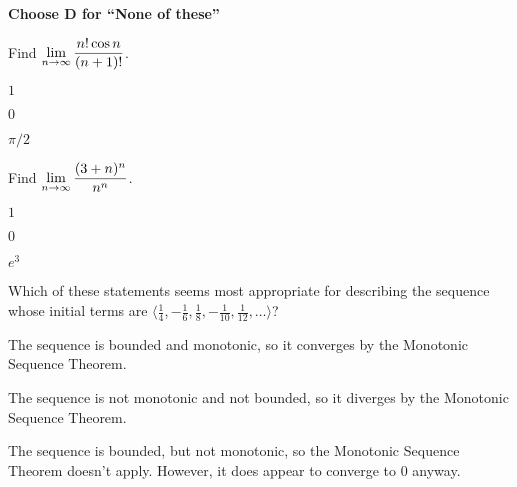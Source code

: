 \documentclass[12pt]{exam}
\newcommand{\ds}{\ensuremath{\displaystyle}}
\newcommand{\<}{\langle}
\renewcommand{\>}{\rangle}
\begin{document}
\begin{center}
\end{center}
\vspace{0.1in}

\vspace{12pt}

\textbf{Choose D for ``None of these''}

\begin{questions}\setcounter{question}{28}

\question
Find \(\ds\lim_{n\to\infty}\frac{n!\cos n}{(n+1)!}\).
\begin{choices}
\item \(1\)
\item \(0\)
\item \(\pi/2\)
\end{choices}

\question
Find \(\ds\lim_{n\to\infty}\frac{(3+n)^n}{n^n}\).
\begin{choices}
\item
  \(1\)
\item
  \(0\)
\item
  \(e^3\)
\end{choices}

\question
Which of these statements seems most appropriate for describing the
sequence whose initial terms are
\(\<\frac{1}{4},-\frac{1}{6},\frac{1}{8},-\frac{1}{10},\frac{1}{12},\dots\>\)?
\begin{choices}
\item The sequence is bounded and monotonic, so it converges by
      the Monotonic Sequence Theorem.
\item The sequence is not monotonic and not bounded, so it diverges by
      the Monotonic Sequence Theorem.
\item The sequence is bounded, but not monotonic, so the Monotonic Sequence
      Theorem doesn't apply. However, it does
      appear to converge to \(0\) anyway.
\end{choices}





\end{questions}
\end{document}

